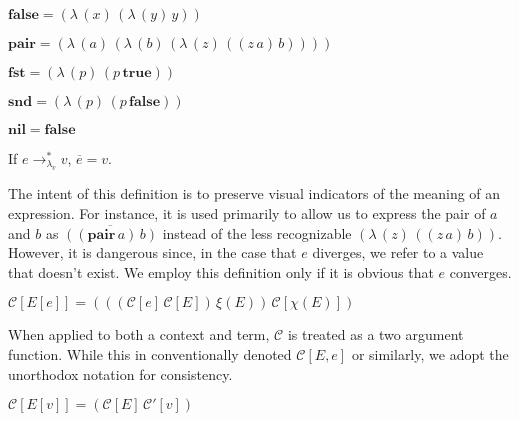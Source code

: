 \documentclass[ms,electronic,twosidetoc,letterpaper,chaptercenter,parttop]{byumsphd}
\newcommand{\true}{\mathbf{true}}
\newcommand{\false}{\mathbf{false}}
\newcommand{\nil}{\mathbf{nil}}
\newcommand{\pair}[2]{((\mathbf{pair}\,#1)\,#2)}
\newcommand{\eval}[1]{\overline{#1}}
\newcommand{\lvrrs}{\rightarrow_{\lambda_v}^{*}}
\newcommand{\C}[1]{\mathcal{C}[#1]}
\newcommand{\Ct}[2]{\mathcal{C}[#1,#2]}
\newcommand{\Cp}[1]{\mathcal{C}'[#1]}
\newcommand{\abs}[2]{(\lambda\,(#1)\,#2)}
\newcommand{\app}[2]{(#1\,#2)}
\begin{document}
\begin{defn}
$\false=\abs{x}{\abs{y}{y}}$
\end{defn}

\begin{defn}
$\mathbf{pair}=\abs{a}{\abs{b}{\abs{z}{\app{\app{z}{a}}{b}}}}$
\end{defn}

\begin{defn}
$\mathbf{fst}=\abs{p}{\app{p}{\true}}$
\end{defn}

\begin{defn}
$\mathbf{snd}=\abs{p}{\app{p}{\false}}$
\end{defn}

\begin{defn}
$\nil=\false$
\end{defn}

\begin{defn}
If $e\lvrrs v$, $\eval{e}=v$.

The intent of this definition is to preserve visual indicators of the meaning of an
expression. For instance, it is used primarily to allow us to express the pair of $a$ and
$b$ as $\eval{\pair{a}{b}}$ instead of the less recognizable
$\abs{z}{\app{\app{z}{a}}{b}}$. However, it is dangerous since, in the case that $e$
diverges, we refer to a value that doesn't exist. We employ this definition only if it is
obvious that $e$ converges.
\end{defn}

\begin{defn}
$\C{E[e]}=\app{\app{\app{\C{e}}{\C{E}}}{\xi(E)}}{\C{\chi(E)}}$

When applied to both a context and term, $\mathcal{C}$ is treated as a two argument
function. While this in conventionally denoted $\Ct{E}{e}$ or similarly, we adopt the
unorthodox notation for consistency.
\end{defn}

\begin{defn}
$\C{E[v]}=\app{\C{E}}{\Cp{v}}$
\end{defn}

\newenvironment{schemedefn}[1]{\begin{defn}$#1$\begin{singlespace}}{\end{singlespace}\end{defn}}
\newenvironment{namedschemedefn}[2]{\begin{defn}\label{#1}$#2$\begin{singlespace}}{\end{singlespace}\end{defn}}
\end{document}
